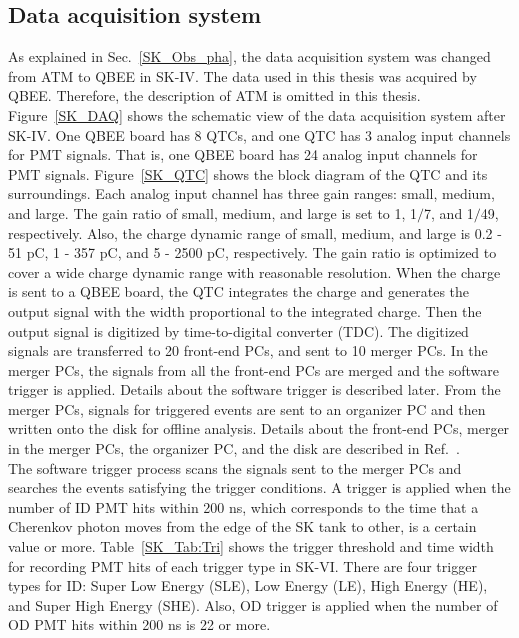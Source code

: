 \subsection{Data acquisition system}
\vs\hs As explained in Sec.~\ref{SK_Obs_pha}, the data acquisition system was changed from ATM to QBEE in SK-IV.
The data used in this thesis was acquired by QBEE.
Therefore, the description of ATM is omitted in this thesis.\\
\hs Figure~\ref{SK_DAQ} shows the schematic view of the data acquisition system after SK-IV.
One QBEE board has 8 QTCs, and one QTC has 3 analog input channels for PMT signals.
That is, one QBEE board has 24 analog input channels for PMT signals.
Figure~\ref{SK_QTC} shows the block diagram of the QTC and its surroundings.
Each analog input channel has three gain ranges: small, medium, and large.
The gain ratio of small, medium, and large is set to 1, 1$/$7, and 1$/$49, respectively.
Also, the charge dynamic range of small, medium, and large is 0.2 - 51 pC, 1 - 357 pC, and 5 - 2500 pC, respectively.
The gain ratio is optimized to cover a wide charge dynamic range with reasonable resolution.
When the charge is sent to a QBEE board, the QTC integrates the charge and generates the output signal with the width proportional to the integrated charge.
Then the output signal is digitized by time-to-digital converter (TDC).
The digitized signals are transferred to 20 front-end PCs, and sent to 10 merger PCs.
In the merger PCs, the signals from all the front-end PCs are merged and the software trigger is applied.
Details about the software trigger is described later.
From the merger PCs, signals for triggered events are sent to an organizer PC and then written onto the disk for offline analysis.
Details about the front-end PCs, merger in the merger PCs, the organizer PC, and the disk are described in Ref.~\cite{2010Yamada}.\\
\hs The software trigger process scans the signals sent to the merger PCs and searches the events satisfying the trigger conditions.
A trigger is applied when the number of ID PMT hits within 200 ns, which corresponds to the time that a Cherenkov photon moves from the edge of the SK tank to other, is a certain value or more.
Table~\ref{SK_Tab:Tri} shows the trigger threshold and time width for recording PMT hits of each trigger type in SK-VI.
There are four trigger types for ID: Super Low Energy (SLE), Low Energy (LE), High Energy (HE), and Super High Energy (SHE).
Also, OD trigger is applied when the number of OD PMT hits within 200 ns is 22 or more.
